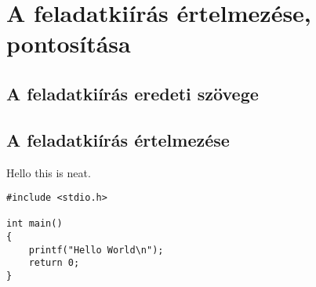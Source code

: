 
\chapter{A feladatkiírás értelmezése, pontosítása}

\section{A feladatkiírás eredeti szövege}

\section{A feladatkiírás értelmezése}

Hello this  is neat.

\begin{lstlisting}
#include <stdio.h>

int main()
{
    printf("Hello World\n");
    return 0;
}

\end{lstlisting}
